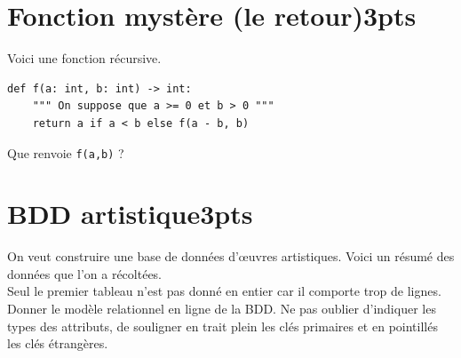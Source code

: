 \documentclass[a4paper,12pt,eval,firamath]{nsi}
\begin{document}
\section{Fonction mystère (le retour)\hfill\tiny 3pts}

Voici une fonction récursive.
\begin{pyc}
    \begin{verbatim}
def f(a: int, b: int) -> int:
    """ On suppose que a >= 0 et b > 0 """
    return a if a < b else f(a - b, b)        
    \end{verbatim}
\end{pyc}

Que renvoie \texttt{f(a,b)} ?\\



\section{BDD artistique\hfill\tiny 3pts}

On veut construire une base de données d'\oe uvres artistiques. Voici un résumé des données que l'on a récoltées.\\
Seul le premier tableau n'est pas donné en entier car il comporte trop de lignes.\\
Donner le modèle relationnel en ligne de la BDD. Ne pas oublier d'indiquer les types des attributs, de souligner en trait plein les clés primaires et en pointillés les clés étrangères.\\
\end{document}
